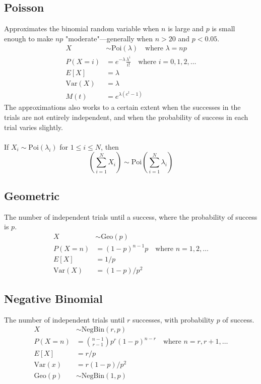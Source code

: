 \documentclass[12pt]{article}
\newcommand{\Sp}{\text{ }}
\newcommand{\Var}{\text{Var}}
\newcommand{\Poi}{\text{Poi}}
\newcommand{\Geo}{\text{Geo}}
\newcommand{\Where}{\Sp\text{ where }}
\begin{document}
\subsection{Poisson}
Approximates the binomial random variable when $n$ is large and $p$ is small enough to make $np$ "moderate"---generally when $n > 20$ and $p < 0.05$.
\begin{align*}
    X& \sim \Poi(\lambda) \Where \lambda = np \\
    P(X = i)& = e^{-\lambda} \frac{\lambda^i}{i!} \Where i = 0,1,2,\ldots\\
        E[X]& = \lambda \\
     \Var(X)& = \lambda \\
        M(t)& = e^{\lambda (e^t - 1)}
\end{align*}
The approximations also works to a certain extent when the successes in the trials are not entirely independent, and when the probability of success in each trial varies slightly. \\
\\
If $X_i \sim \Poi(\lambda_i)$ for $1 \leq i \leq N$, then
\[
    \left( \sum_{i=1}^N X_i \right) \sim \Poi\left(\sum_{i=1}^N \lambda_i \right)
\]

\subsection{Geometric}
The number of independent trials until a success, where the probability of success is $p$.
\begin{align*}
    X& \sim \Geo(p) \\
    P(X = n)& = (1-p)^{n-1} p \Where n = 1, 2, \ldots\\
        E[X]& = 1/p \\
     \Var(X)& = (1-p)/p^2
\end{align*}

\subsection{Negative Binomial}
The number of independent trials until $r$ successes, with probability $p$ of success.
\begin{align*}
    X& \sim \text{NegBin}(r, p) \\
    P(X = n)& = \binom{n-1}{r-1} p^r (1-p)^{n-r} \Where n = r, r+1, \ldots \\
        E[X]& = r / p \\
     \Var(x)& = r(1-p)/p^2 \\
     \Geo(p)& \sim \text{NegBin}(1, p)
\end{align*}
\end{document}
